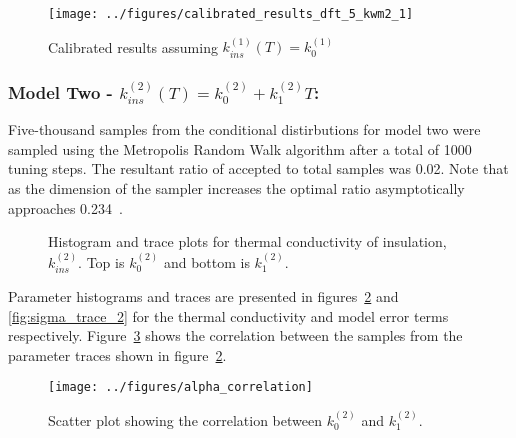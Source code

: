 \documentclass[article]{proc}
\begin{document}
        \begin{figure}[!]
            \centering
            \texttt{[image: ../figures/calibrated\_results\_dft\_5\_kwm2\_1]}
            \caption{Calibrated results assuming $k^{(1)}_{ins}(T) = k^{(1)}_0$}
            \label{fig:cal_results_1}
        \end{figure}

        \subsubsection{Model Two - $k^{(2)}_{ins}(T) = k^{(2)}_0 + k^{(2)}_1 T$:}

        Five-thousand samples from the conditional distirbutions for model two were sampled using the Metropolis Random Walk algorithm after a total of 1000 tuning steps. The resultant ratio of accepted to total samples was 0.02. Note that as the dimension of the sampler increases the optimal ratio asymptotically approaches 0.234~\cite{Roberts:1997}. 

        \begin{figure}[b!]
            \centering
            \qquad

            \qquad
            \caption{Histogram and trace plots for thermal conductivity of insulation, $k^{(2)}_{ins}$. Top is $k^{(2)}_0$ and bottom is $k^{(2)}_1$.}
            \label{fig:param_trace_2}
        \end{figure}

        Parameter histograms and traces are presented in figures~\ref{fig:param_trace_2} and \ref{fig:sigma_trace_2} for the thermal conductivity and model error terms respectively. Figure~\ref{fig:alpha_correlation} shows the correlation between the samples from the parameter traces shown in figure~\ref{fig:param_trace_2}. 

        \begin{figure}[h!]
            \centering
            \texttt{[image: ../figures/alpha\_correlation]}
            \caption{Scatter plot showing the correlation between $k^{(2)}_0$ and $k^{(2)}_1$.}
            \label{fig:alpha_correlation}
        \end{figure}
\end{document}
